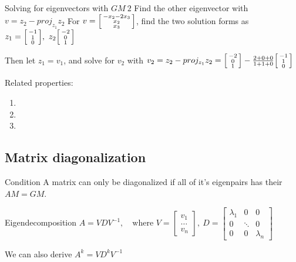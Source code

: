 \documentclass{article}
\begin{document}
\begin{knBox}[]{Solving for eigenvectors with $GM\ 2$}
    Find the other eigenvector with $v = z_2 - proj_{z_1}z_2$
    \tcblower
    For $v=\begin{bsmallmatrix}
            -x_2-2x_3\\x_2\\x_3
        \end{bsmallmatrix}$, find the two solution forms as $z_1=\begin{bsmallmatrix}
            -1\\1\\0
        \end{bsmallmatrix},\ z_2\begin{bsmallmatrix}
            -2\\0\\1
        \end{bsmallmatrix}$

    Then let $z_1=v_1$, and solve for $v_2$ with $v_2=z_2-proj_{z_1}z_2=\begin{bsmallmatrix}
            -2\\0\\1
        \end{bsmallmatrix} - \frac{2+0+0}{1+1+0}\begin{bsmallmatrix}
            -1\\1\\0
        \end{bsmallmatrix}$
\end{knBox}

Related properties:

\begin{enumerate}
    \item {}
    \item {}
    \item {}
\end{enumerate}

\subsection{Matrix diagonalization}
\label{sec:diag}
\begin{definition}[]{Condition}
    A matrix can only be diagonalized if all of it's eigenpairs has their $AM = GM$.
\end{definition}
\begin{knBox}[]{Eigendecomposition}
    $A=VDV^{-1},\quad\text{where }V=\begin{bmatrix}
            v_1 \\\dots\\v_n
        \end{bmatrix},\ D=\begin{bmatrix}
            \lambda_1 & 0 & 0 \\0&\ddots&0\\0&0&\lambda_n
        \end{bmatrix}$

    We can also derive $A^k=VD^kV^{-1}$
\end{knBox}
\end{document}
